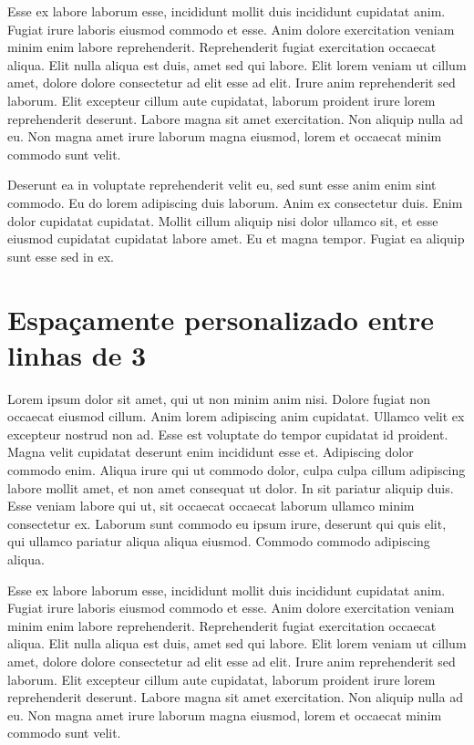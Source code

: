 \documentclass{article}
\begin{document}
Esse ex labore laborum esse, incididunt mollit duis incididunt
cupidatat anim. Fugiat irure laboris eiusmod commodo et esse. Anim
dolore exercitation veniam minim enim labore reprehenderit.
Reprehenderit fugiat exercitation occaecat aliqua. Elit nulla aliqua
est duis, amet sed qui labore.
Elit lorem veniam ut cillum amet, dolore dolore consectetur ad elit
esse ad elit. Irure anim reprehenderit sed laborum.
Elit excepteur cillum aute cupidatat, laborum proident irure lorem
reprehenderit deserunt. Labore magna sit amet exercitation.
Non aliquip nulla ad eu. Non magna amet irure laborum magna eiusmod,
lorem et occaecat minim commodo sunt velit.

Deserunt ea in voluptate reprehenderit velit eu, sed sunt esse anim
enim sint commodo.
Eu do lorem adipiscing duis laborum. Anim ex consectetur duis. Enim
dolor cupidatat cupidatat.
Mollit cillum aliquip nisi dolor ullamco sit, et esse eiusmod
cupidatat cupidatat labore amet. Eu et magna tempor.
Fugiat ea aliquip sunt esse sed in ex.

\section{Espaçamente personalizado entre linhas de 3}


Lorem ipsum dolor sit amet, qui ut non minim anim nisi. Dolore fugiat
non occaecat eiusmod cillum.
Anim lorem adipiscing anim cupidatat. Ullamco velit ex excepteur
nostrud non ad. Esse est voluptate do tempor cupidatat id proident.
Magna velit cupidatat deserunt enim incididunt esse et. Adipiscing
dolor commodo enim.
Aliqua irure qui ut commodo dolor, culpa culpa cillum adipiscing
labore mollit amet, et non amet consequat ut dolor.
In sit pariatur aliquip duis. Esse veniam labore qui ut, sit occaecat
occaecat laborum ullamco minim consectetur ex.
Laborum sunt commodo eu ipsum irure, deserunt qui quis elit, qui
ullamco pariatur aliqua aliqua eiusmod. Commodo commodo adipiscing aliqua.

Esse ex labore laborum esse, incididunt mollit duis incididunt
cupidatat anim. Fugiat irure laboris eiusmod commodo et esse. Anim
dolore exercitation veniam minim enim labore reprehenderit.
Reprehenderit fugiat exercitation occaecat aliqua. Elit nulla aliqua
est duis, amet sed qui labore.
Elit lorem veniam ut cillum amet, dolore dolore consectetur ad elit
esse ad elit. Irure anim reprehenderit sed laborum.
Elit excepteur cillum aute cupidatat, laborum proident irure lorem
reprehenderit deserunt. Labore magna sit amet exercitation.
Non aliquip nulla ad eu. Non magna amet irure laborum magna eiusmod,
lorem et occaecat minim commodo sunt velit.
\end{document}
